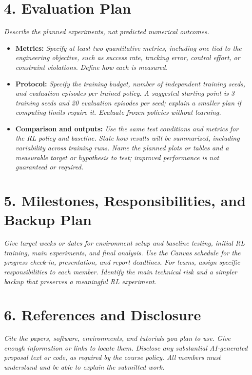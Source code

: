\documentclass[11pt,letterpaper]{article}
\newcommand{\prompt}[1]{{\itshape #1}}
\begin{document}
\section*{4. Evaluation Plan}
\prompt{Describe the planned experiments, not predicted numerical outcomes.}
\begin{itemize}
  \item \textbf{Metrics:} \prompt{Specify at least two quantitative metrics,
  including one tied to the engineering objective, such as success rate, tracking
  error, control effort, or constraint violations. Define how each is measured.}
  \item \textbf{Protocol:} \prompt{Specify the training budget, number of independent
  training seeds, and evaluation episodes per trained policy. A suggested starting
  point is 3 training seeds and 20 evaluation episodes per seed; explain a smaller
  plan if computing limits require it. Evaluate frozen policies without learning.}
  \item \textbf{Comparison and outputs:} \prompt{Use the same test conditions and
  metrics for the RL policy and baseline. State how results will be summarized,
  including variability across training runs. Name the planned plots or tables
  and a measurable target or hypothesis to test; improved performance is not
  guaranteed or required.}
\end{itemize}

\section*{5. Milestones, Responsibilities, and Backup Plan}
\prompt{Give target weeks or dates for environment setup and baseline testing,
initial RL training, main experiments, and final analysis. Use the Canvas schedule
for the progress check-in, presentation, and report deadlines. For teams, assign
specific responsibilities to each member. Identify the main technical risk and
a simpler backup that preserves a meaningful RL experiment.}

\section*{6. References and Disclosure}
\prompt{Cite the papers, software, environments, and tutorials you plan to use.
Give enough information or links to locate them. Disclose any substantial
AI-generated proposal text or code, as required by the course policy. All members
must understand and be able to explain the submitted work.}
\end{document}
